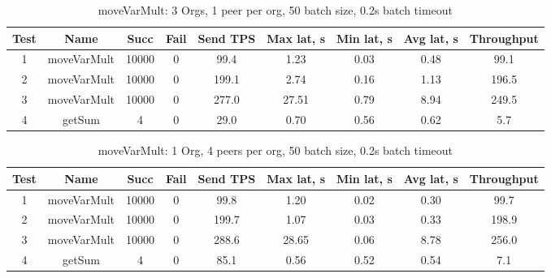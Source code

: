 \begin{appendices}
\begin{table}[h!]
\begin{center}
\begin{tabular}{ |c|c|c|c|c|c|c|c|c| }
 \hline
  Test & Name & Succ  & Fail & Send TPS & Max lat, s & Min lat, s & Avg lat, s & Throughput \\
 \hline
 \hline
 1    & moveVarMult & 10000 & 0    & 99.4  & 1.23      & 0.03      & 0.48      & 99.1   \\
 \hline
 2    & moveVarMult & 10000 & 0    & 199.1 & 2.74      & 0.16      & 1.13      & 196.5  \\
 \hline
 3    & moveVarMult & 10000 & 0    & 277.0 & 27.51     & 0.79      & 8.94      & 249.5  \\
 \hline
 4    & getSum      & 4     & 0    & 29.0  & 0.70      & 0.56      & 0.62      & 5.7    \\
 \hline
\end{tabular}
\end{center}
\caption{moveVarMult: 3 Orgs, 1 peer per org, 50 batch size, 0.2s batch timeout}
\end{table}

\begin{table}[h!]
\begin{center}
\begin{tabular}{ |c|c|c|c|c|c|c|c|c| }
 \hline
  Test & Name & Succ  & Fail & Send TPS & Max lat, s & Min lat, s & Avg lat, s & Throughput \\
 \hline
 \hline
 1    & moveVarMult & 10000 & 0    & 99.8  & 1.20      & 0.02      & 0.30      & 99.7   \\
 \hline
 2    & moveVarMult & 10000 & 0    & 199.7 & 1.07      & 0.03      & 0.33      & 198.9  \\
 \hline
 3    & moveVarMult & 10000 & 0    & 288.6 & 28.65     & 0.06      & 8.78      & 256.0  \\
 \hline
 4    & getSum      & 4     & 0    & 85.1  & 0.56      & 0.52      & 0.54      & 7.1    \\
 \hline
\end{tabular}
\end{center}
\caption{moveVarMult: 1 Org, 4 peers per org, 50 batch size, 0.2s batch timeout}
\end{table}


\end{appendices}

